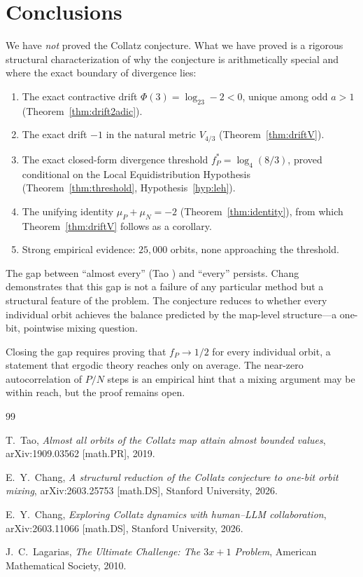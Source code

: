 \documentclass[12pt,reqno]{amsart}
\theoremstyle{plain}
\theoremstyle{definition}
\newcommand{\logtwo}{\log_2}
\newcommand{\logfour}{\log_4}
\newcommand{\fP}{f_P}
\newcommand{\fPstar}{f_P^*}
\newcommand{\muP}{\mu_P}
\newcommand{\muN}{\mu_N}
\newcommand{\PhiDrift}{\Phi}
\newcommand{\Vmetric}{V_{4/3}}
\begin{document}
\section{Conclusions}\label{sec:conclusions}

We have \emph{not} proved the Collatz conjecture.
What we have proved is a rigorous structural characterization of why the
conjecture is arithmetically special and where the exact boundary of divergence lies:

\begin{enumerate}
\item The exact contractive drift $\PhiDrift(3) = \logtwo 3 - 2 < 0$,
unique among odd $a > 1$ (Theorem~\ref{thm:drift2adic}).
\item The exact drift $-1$ in the natural metric $\Vmetric$ (Theorem~\ref{thm:driftV}).
\item The exact closed-form divergence threshold
$\fPstar = \logfour(8/3)$, proved conditional on the Local Equidistribution
Hypothesis (Theorem~\ref{thm:threshold}, Hypothesis~\ref{hyp:leh}).
\item The unifying identity $\muP + \muN = -2$ (Theorem~\ref{thm:identity}),
from which Theorem~\ref{thm:driftV} follows as a corollary.
\item Strong empirical evidence: $25{,}000$ orbits, none approaching the threshold.
\end{enumerate}

The gap between ``almost every'' (Tao \cite{tao2019}) and ``every'' persists.
Chang \cite{chang2026paradigm} demonstrates that this gap is not a failure of
any particular method but a structural feature of the problem.
The conjecture reduces to whether every individual orbit achieves the balance
predicted by the map-level structure---a one-bit, pointwise mixing question.

Closing the gap requires proving that $\fP \to 1/2$ for every individual orbit,
a statement that ergodic theory reaches only on average.
The near-zero autocorrelation of $P/N$ steps is an empirical hint that a mixing
argument may be within reach, but the proof remains open.

\begin{thebibliography}{99}

T.~Tao, \textit{Almost all orbits of the Collatz map attain almost bounded values},
arXiv:1909.03562 [math.PR], 2019.

E.~Y.~Chang, \textit{A structural reduction of the Collatz conjecture to one-bit orbit mixing},
arXiv:2603.25753 [math.DS], Stanford University, 2026.

E.~Y.~Chang, \textit{Exploring Collatz dynamics with human--LLM collaboration},
arXiv:2603.11066 [math.DS], Stanford University, 2026.

J.~C.~Lagarias, \textit{The Ultimate Challenge: The $3x+1$ Problem},
American Mathematical Society, 2010.

\end{thebibliography}
\end{document}
